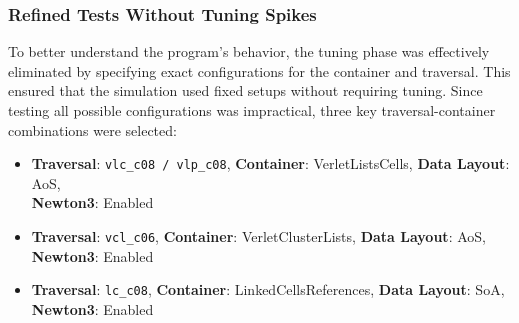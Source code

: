 





\subsubsection{Refined Tests Without Tuning Spikes}

To better understand the program's behavior, the tuning phase was effectively eliminated by specifying exact configurations for the container and traversal. This ensured that the simulation used fixed setups without requiring tuning. Since testing all possible configurations was impractical, three key traversal-container combinations were selected:


\begin{itemize}
    \item \textbf{Traversal}: \texttt{vlc\_c08 / vlp\_c08}, \textbf{Container}: VerletListsCells, \textbf{Data Layout}: AoS, \\ \textbf{Newton3}: Enabled
    \item \textbf{Traversal}: \texttt{vcl\_c06}, \textbf{Container}: VerletClusterLists, \textbf{Data Layout}: AoS, \\ \textbf{Newton3}: Enabled
    \item \textbf{Traversal}: \texttt{lc\_c08}, \textbf{Container}: LinkedCellsReferences, \textbf{Data Layout}: SoA, \\ \textbf{Newton3}: Enabled
\end{itemize}



